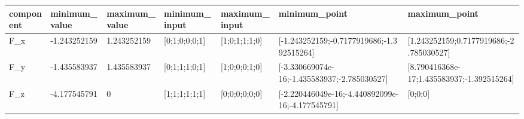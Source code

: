 \begin{tabular}{@{}lllllll@{}}
\toprule
component & minimum\_value & maximum\_value & minimum\_input & maximum\_input & minimum\_point & maximum\_point \\
\midrule
F\_x & -1.243252159 & 1.243252159 & [0;1;0;0;0;1] & [1;0;1;1;1;0] & [-1.243252159;-0.7177919686;-1.392515264] & [1.243252159;0.7177919686;-2.785030527] \\
F\_y & -1.435583937 & 1.435583937 & [0;1;1;1;0;1] & [1;0;0;0;1;0] & [-3.330669074e-16;-1.435583937;-2.785030527] & [8.790416368e-17;1.435583937;-1.392515264] \\
F\_z & -4.177545791 & 0 & [1;1;1;1;1;1] & [0;0;0;0;0;0] & [-2.220446049e-16;-4.440892099e-16;-4.177545791] & [0;0;0] \\
\bottomrule
\end{tabular}
